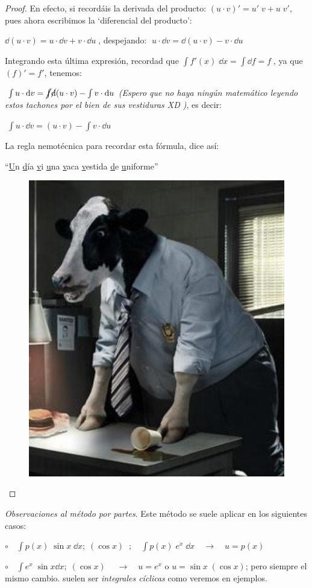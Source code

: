 \begin{proof} En efecto, si recordáis la derivada del producto: $(u \cdot v)' = u'\; v + u\; v'$, pues ahora escribimos la `diferencial del producto':

$\dd (u\cdot v)= u \cdot \dd v + v \cdot \dd  u\; $, despejando: $\; u \cdot \dd v = \dd (u\cdot v) - v \cdot \dd  u$	

Integrando esta última expresión, recordad que $\int f'(x)\; \dd x= \int \dd f = f\; $, ya que $(f)'=f'$, tenemos:

$\; \int u \cdot \dd v = \cancel{\int} \cancel{\dd }(u\cdot v) - \int v \cdot \dd  u$	 \emph{(Espero que no haya ningún matemático leyendo estos tachones por el bien de sus vestiduras XD )}, es decir:

\begin{multicols}{2}
\vspace{2mm} \centerline{$\; \int u \cdot \dd v = (u\cdot v) - \int v \cdot \dd  u$	}

\vspace{3mm} La regla nemotécnica para recordar esta fórmula, dice así:

\vspace{3mm} ``\underline{U}n \underline{d}ía \underline{v}i \underline{u}na \underline{v}aca \underline{v}estida \underline{d}e \underline{u}niforme'' 

	\begin{figure}[H]
			\centering
			\includegraphics[width=0.25
			\textwidth]{imagenes/imagenes07/T07IM02.png}
	\end{figure}
\end{multicols}
\end{proof}

\emph{Observaciones al método por partes}. Este método se suele aplicar en los siguientes casos:

$\circ \quad \displaystyle \int p(x) \;  \sin x \; \dd x ;\; (\cos x)\; \; ; \quad \displaystyle \int p(x) \; e^x \; \dd x \quad \to \quad u=p(x)$

$\circ \quad \displaystyle \int e^x \; \sin x \dd x ; \; (\cos x) \; \quad \to \quad u= e^x \mbox{ o } u=\sin x \; (\cos x)$; pero siempre el mismo cambio. suelen ser \emph{integrales cíclicas} como veremos en ejemplos.

